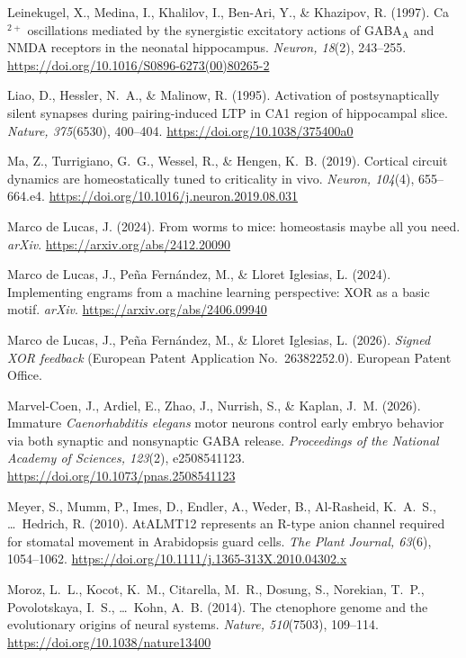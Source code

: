 \documentclass[11pt,a4paper]{article}
\newenvironment{apabib}{\raggedright\begin{list}{}{%
  \setlength{\leftmargin}{1.6em}\setlength{\itemindent}{-1.6em}%
  \setlength{\itemsep}{3pt}\setlength{\parsep}{0pt}\setlength{\topsep}{4pt}}}%
  {\end{list}}
\begin{document}
\begin{apabib}
\item Leinekugel, X., Medina, I., Khalilov, I., Ben-Ari, Y., \& Khazipov, R. (1997). Ca$^{2+}$ oscillations mediated by the synergistic excitatory actions of GABA$_{\mathrm{A}}$ and NMDA receptors in the neonatal hippocampus. \emph{Neuron, 18}(2), 243--255. \url{https://doi.org/10.1016/S0896-6273(00)80265-2}
\item Liao, D., Hessler, N.~A., \& Malinow, R. (1995). Activation of postsynaptically silent synapses during pairing-induced LTP in CA1 region of hippocampal slice. \emph{Nature, 375}(6530), 400--404. \url{https://doi.org/10.1038/375400a0}
\item Ma, Z., Turrigiano, G.~G., Wessel, R., \& Hengen, K.~B. (2019). Cortical circuit dynamics are homeostatically tuned to criticality in vivo. \emph{Neuron, 104}(4), 655--664.e4. \url{https://doi.org/10.1016/j.neuron.2019.08.031}
\item Marco de Lucas, J. (2024). From worms to mice: homeostasis maybe all you need. \emph{arXiv}. \url{https://arxiv.org/abs/2412.20090}
\item Marco de Lucas, J., Pe\~na Fern\'andez, M., \& Lloret Iglesias, L. (2024). Implementing engrams from a machine learning perspective: XOR as a basic motif. \emph{arXiv}. \url{https://arxiv.org/abs/2406.09940}
\item Marco de Lucas, J., Pe\~na Fern\'andez, M., \& Lloret Iglesias, L. (2026). \emph{Signed XOR feedback} (European Patent Application No.~26382252.0). European Patent Office.
\item Marvel-Coen, J., Ardiel, E., Zhao, J., Nurrish, S., \& Kaplan, J.~M. (2026). Immature \emph{Caenorhabditis elegans} motor neurons control early embryo behavior via both synaptic and nonsynaptic GABA release. \emph{Proceedings of the National Academy of Sciences, 123}(2), e2508541123. \url{https://doi.org/10.1073/pnas.2508541123}
\item Meyer, S., Mumm, P., Imes, D., Endler, A., Weder, B., Al-Rasheid, K.~A.~S., \ldots\ Hedrich, R. (2010). AtALMT12 represents an R-type anion channel required for stomatal movement in Arabidopsis guard cells. \emph{The Plant Journal, 63}(6), 1054--1062. \url{https://doi.org/10.1111/j.1365-313X.2010.04302.x}
\item Moroz, L.~L., Kocot, K.~M., Citarella, M.~R., Dosung, S., Norekian, T.~P., Povolotskaya, I.~S., \ldots\ Kohn, A.~B. (2014). The ctenophore genome and the evolutionary origins of neural systems. \emph{Nature, 510}(7503), 109--114. \url{https://doi.org/10.1038/nature13400}

\end{apabib}
\end{document}
